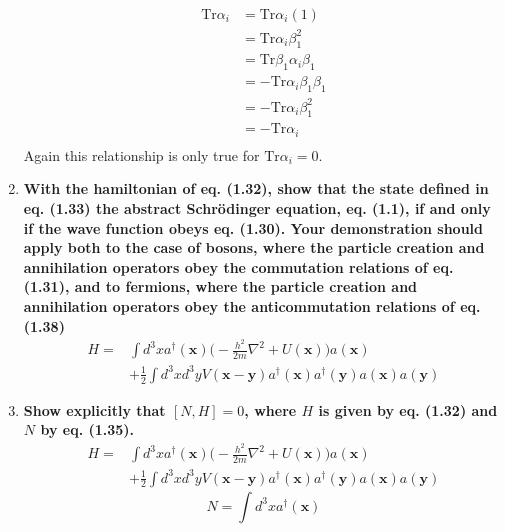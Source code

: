 \documentclass[9pt]{report}
\begin{document}
\begin{enumerate}
  \[
    \begin{align}
      \text{Tr}\alpha_i &= \text{Tr}\alpha_i(1)\\
                        &= \text{Tr}\alpha_i\beta^2_1\\
                        &= \text{Tr}\beta_1\alpha_i\beta_1\\
                        &= -\text{Tr}\alpha_i\beta_1\beta_1\\
                        &= -\text{Tr}\alpha_i\beta_1^2\\
                        &= -\text{Tr}\alpha_i\\
    \end{align}
  \]
  Again this relationship is only true for $\text{Tr}\alpha_i = 0$.

\item \textbf{With the hamiltonian of eq. (1.32), show that the state defined in
  eq. (1.33) the abstract Schr\"{o}dinger equation, eq. (1.1), if and only if
  the wave function obeys eq. (1.30). Your demonstration should apply both to the
  case of bosons, where the particle creation and annihilation operators obey
  the commutation relations of eq. (1.31), and to fermions, where the particle
  creation and annihilation operators obey the anticommutation relations of
  eq. (1.38)}
  \[
    \begin{align}
      H = &\int d^3 x a^\dagger(\bm{x})\Big(-\frac{h^2}{2m} \nabla^2 + U(\bm{x}) \Big) a(\bm{x}) \\
    &+ \frac{1}{2} \int d^3xd^3y V(\bm{x} - \bm{y}) a^\dagger(\bm{x}) a^\dagger(\bm{y}) a(\bm{x})a(\bm{y})
    \end{align}
  \]

\item \textbf{Show explicitly that $[N, H] = 0$, where $H$ is given by eq.
  (1.32) and $N$ by eq. (1.35).}
  \[
    \begin{align}
      H = &\int d^3 x a^\dagger(\bm{x})\Big(-\frac{h^2}{2m} \nabla^2 + U(\bm{x}) \Big) a(\bm{x}) \\
    &+ \frac{1}{2} \int d^3xd^3y V(\bm{x} - \bm{y}) a^\dagger(\bm{x}) a^\dagger(\bm{y}) a(\bm{x})a(\bm{y})
    \end{align}
  \]
  \[
    N = \int d^3x a^\dagger(\bm{x})
  \]

\end{enumerate}
\end{document}
